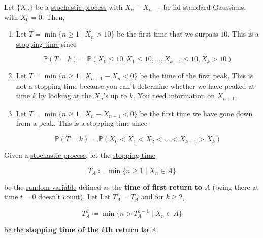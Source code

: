 \begin{example}
	\label{ex:coin-toss}
	Let $\{X_n\}$ be a \hyperref[def:stochastic-process]{stochastic process} with $X_n - X_{n - 1}$ be iid standard Gaussians, with $X_0 = 0$. Then, 
	\begin{enumerate}
		\item Let $T = \min\{n \geq 1 \mid X_n > 10\}$ be the first time that we surpass $10$. This is a \hyperref[def:stopping-time]{stopping time} since 

			\begin{equation}
				\mathbb{P}(T = k) = \mathbb{P}(X_0 \leq 10, X_1 \leq 10, \ldots, X_{k-1} \leq 10, X_{k} > 10)
			\end{equation}
		
		\item Let $T = \min\{n \geq 1 \mid X_{n+1} - X_n < 0\}$ be the time of the first peak. This is not a stopping time because you can't determine whether we have peaked at time $k$ by looking at the $X_n$'s up to $k$. You need information on $X_{n + 1}$. 
		
		\item Let $T = \min\{n \geq 1 \mid X_{n} - X_{n-1} < 0\}$ be the first time we have gone down from a peak. This is a stopping time since 

			\begin{equation}
				\mathbb{P}(T = k) = \mathbb{P}(X_0 < X_1 < X_2 < \ldots < X_{k-1} > X_k)
			\end{equation}
	\end{enumerate}
\end{example}

\begin{definition}
	\label{def:time-of-return}
	Given a \hyperref[def:stochastic-process]{stochastic process}, let the \hyperref[def:stopping-time]{stopping time} 

		\begin{equation}
			T_A \coloneqq \min \{ n \geq 1 \mid X_n \in A\}
		\end{equation}

	be the \hyperref[prob-def:random-variable]{random variable} defined as the \textbf{time of first return to $A$} (being there at time $t = 0$ doesn't count). Let 
	Let $T^1_A = T_A$ and for $k \geq 2$, 

		\begin{equation}
			T_A^k \coloneqq \min \{ n > T^{k-1}_A \mid X_n \in A\}
		\end{equation}

	be the \textbf{stopping time of the $k$th return to $A$}. 
\end{definition}


